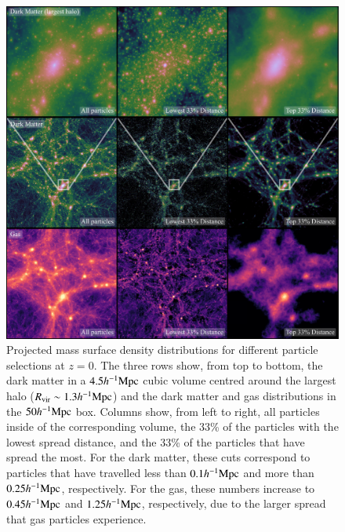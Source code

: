 \begin{figure}
    \centering
    \includegraphics[width=\textwidth]{figures/distance_figures_3.pdf}
    \caption{Projected mass surface density distributions for different particle selections at $z=0$.
    The three rows show, 
    from top to bottom, the dark matter in a $4.5h^{-1}{\rm Mpc}{}$ cubic volume centred around the largest halo ($R_{\rm vir}\sim 1.3h^{-1}{\rm Mpc}{}$)
    and the dark matter and gas distributions in the $50h^{-1}{\rm Mpc}{}$ box.
    Columns show, from left to right, all
    particles inside of the corresponding volume, the 33\% of the particles with the lowest spread distance, 
    and the 33\% of the particles that have spread the  most. For the dark matter, these cuts
    correspond to particles that have travelled less than $0.1h^{-1}{\rm Mpc}{}$ and
    more than $0.25h^{-1}{\rm Mpc}{}$, respectively. For the gas, these numbers
    increase to $0.45h^{-1}{\rm Mpc}{}$ and $1.25h^{-1}{\rm Mpc}{}$, respectively, due to the
    larger spread that gas particles experience. 
}
\end{figure}
